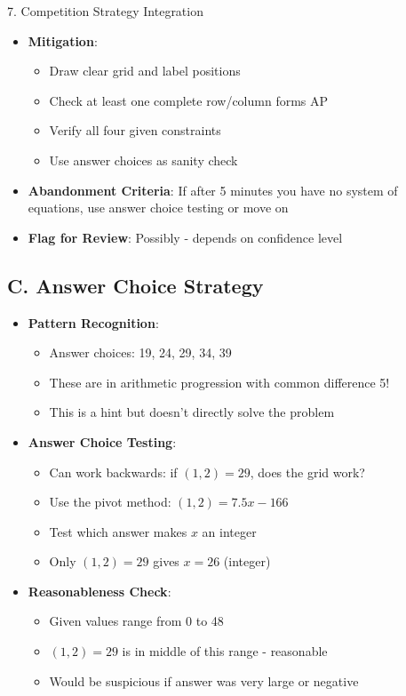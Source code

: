 \documentclass[12pt]{article}
\begin{document}
\begin{competitionbox}{7. Competition Strategy Integration}
\begin{itemize}[leftmargin=*]
    \item \textbf{Mitigation}:
    \begin{itemize}
        \item Draw clear grid and label positions
        \item Check at least one complete row/column forms AP
        \item Verify all four given constraints
        \item Use answer choices as sanity check
    \end{itemize}
    
    \item \textbf{Abandonment Criteria}: If after 5 minutes you have no system of equations, use answer choice testing or move on
    
    \item \textbf{Flag for Review}: Possibly - depends on confidence level
\end{itemize}

\subsection*{C. Answer Choice Strategy}
\begin{itemize}[leftmargin=*]
    \item \textbf{Pattern Recognition}:
    \begin{itemize}
        \item Answer choices: 19, 24, 29, 34, 39
        \item These are in arithmetic progression with common difference 5!
        \item This is a hint but doesn't directly solve the problem
    \end{itemize}
    
    \item \textbf{Answer Choice Testing}:
    \begin{itemize}
        \item Can work backwards: if $(1,2) = 29$, does the grid work?
        \item Use the pivot method: $(1,2) = 7.5x - 166$
        \item Test which answer makes $x$ an integer
        \item Only $(1,2) = 29$ gives $x = 26$ (integer)
    \end{itemize}
    
    \item \textbf{Reasonableness Check}:
    \begin{itemize}
        \item Given values range from 0 to 48
        \item $(1,2) = 29$ is in middle of this range - reasonable
        \item Would be suspicious if answer was very large or negative
    \end{itemize}
\end{itemize}


\end{competitionbox}
\end{document}
